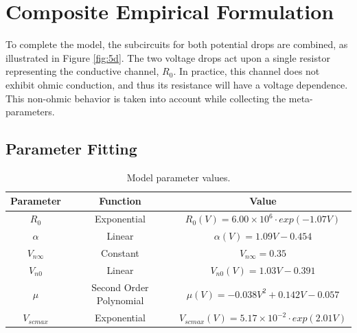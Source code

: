 \section[Composite Empirical Formulation]{Composite Empirical Formulation}


\noindent To complete the model, the subcircuits for both potential drops are combined, as illustrated in Figure \ref{fig:5d}. The two voltage drops act upon a single resistor representing the conductive channel, $R_0$. In practice, this channel does not exhibit ohmic conduction, and thus its resistance will have a voltage dependence. This non-ohmic behavior is taken into account while collecting the meta-parameters.

\subsection[Parameter Fitting]{Parameter Fitting}

\begin{table}[ht]
    \caption{Model parameter values.}
    \centering
    \begin{tabular}{|c|c|c|}
    \hline
    Parameter   & Function                & Value                                      \\ \hline
    $R_0$       & Exponential             & $R_0(V) = 6.00 \times 10^6 \cdot exp(-1.07V)$         \\ \hline
    $\alpha$    & Linear                  & $\alpha(V) = 1.09V -0.454$                 \\ \hline
    $V_{n\infty}$ & Constant                & $V_{n\infty} = 0.35$                         \\ \hline
    $V_{n0}$    & Linear                  & $V_{n0}(V) = 1.03V - 0.391 $               \\ \hline
    $\mu$       & Second Order Polynomial & $\mu(V) = -0.038V^2 + 0.142V - 0.057$      \\ \hline
    $V_{scmax}$ & Exponential             & $V_{scmax}(V) = 5.17 \times 10^{-2} \cdot exp(2.01V)$ \\ \hline
    \end{tabular}
    \label{table:5b}
\end{table}

